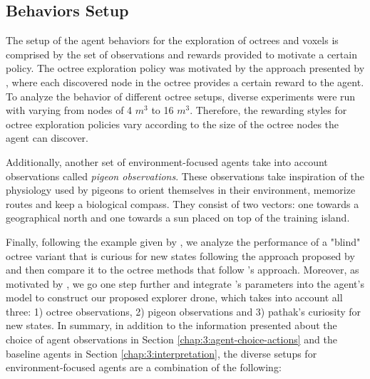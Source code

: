  
\subsection{Behaviors Setup}\label{chap:4:behaviors}

The setup of the agent behaviors for the exploration of octrees and voxels is comprised by the set of observations and rewards provided to motivate a certain policy. The octree exploration policy was motivated by the approach presented by \textcite{chen2019learning}, where each discovered node in the octree provides a certain reward to the agent. To analyze the behavior of different octree setups, diverse experiments were run with varying from nodes of 4 $m^3$ to 16 $m^3$. Therefore, the rewarding styles for octree exploration policies vary according to the size of the octree nodes the agent can discover.

Additionally, another set of environment-focused agents take into account observations called \textit{pigeon observations}. These observations take inspiration of the physiology used by pigeons to orient themselves in their environment, memorize routes and keep a biological compass. They consist of two vectors: one towards a geographical north and one towards a sun placed on top of the training island. 

Finally, following the example given by \textcite{chaplot2020semantic}, we analyze the performance of a "blind" octree variant that is curious for new states following the approach proposed by  \textcite{pathak2017curiosity} and then compare it to the octree methods that follow \textcite{chen2019learning}'s approach. Moreover, as motivated by \textcite{github-unity-mlagents-toolkit}, we go one step further and integrate \textcite{pathak2017curiosity}'s parameters into the agent's model to construct our proposed explorer drone, which takes into account all three: 1) octree observations, 2) pigeon observations and 3) pathak's curiosity for new states. In summary, in addition to the information presented about the choice of agent observations in Section \ref{chap:3:agent-choice-actions} and the baseline agents in Section \ref{chap:3:interpretation}, the diverse setups for environment-focused agents are a combination of the following:

